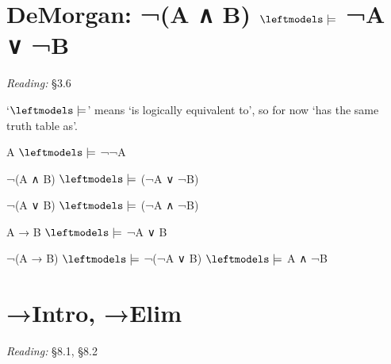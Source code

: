 \documentclass[12pt]{extarticle}
\begin{document}
\begin{multicols*}{3}
 
\section{DeMorgan: ¬(A ∧ B) $\leftmodels\models$ ¬A ∨ ¬B}
 
\emph{Reading:} §3.6
 
`$\leftmodels\models$' means `is logically equivalent to', so for now `has the same truth table as'.
 
A $\leftmodels\models$ ¬¬A
 
¬(A ∧ B) $\leftmodels\models$ (¬A ∨ ¬B)
 
¬(A ∨ B) $\leftmodels\models$ (¬A ∧ ¬B)
 
A → B $\leftmodels\models$ ¬A ∨ B
 
¬(A → B) $\leftmodels\models$ ¬(¬A ∨ B) $\leftmodels\models$ A ∧ ¬B
 
 
 
\section{→Intro, →Elim}
 
\emph{Reading:} §8.1, §8.2
 

\end{multicols*}
\end{document}
